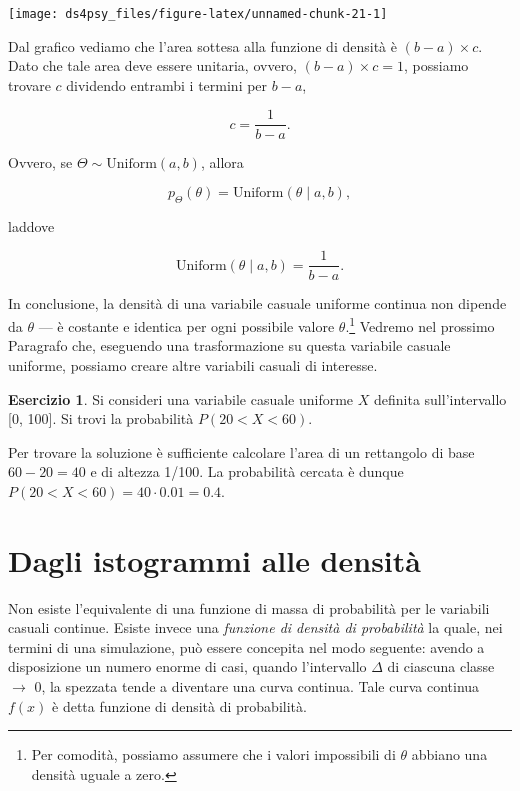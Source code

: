 \documentclass[
  11pt,
]{krantz}
\theoremstyle{definition}
\theoremstyle{definition}
\theoremstyle{definition}
\newtheorem{exercise}{Esercizio}[chapter]
\theoremstyle{definition}
\theoremstyle{remark}
\begin{document}
\begin{center}\texttt{[image: ds4psy\_files/figure-latex/unnamed-chunk-21-1]} \end{center}

\noindent Dal grafico vediamo che l'area sottesa alla funzione di densità è \((b - a)\times c\). Dato che tale area deve essere unitaria, ovvero, \((b - a) \times c = 1\), possiamo trovare \(c\) dividendo entrambi i termini per \(b - a\),

\[
c  = \frac{\displaystyle{1}}{\displaystyle b - a}.
\]

Ovvero, se \(\Theta \sim \mbox{Uniform}(a, b)\), allora

\[
p_{\Theta}(\theta) = \mbox{Uniform}(\theta \mid a, b),
\]

laddove

\[
\mbox{Uniform}(\theta \mid a, b) = \frac{1}{b - a}.
\]

In conclusione, la densità di una variabile casuale uniforme continua non dipende da \(\theta\) --- è costante e identica per ogni possibile valore \(\theta\).\footnote{Per comodità, possiamo assumere che i valori impossibili di \(\theta\) abbiano una densità uguale a zero.} Vedremo nel prossimo Paragrafo che, eseguendo una trasformazione su questa variabile casuale uniforme, possiamo creare altre variabili casuali di interesse.

\begin{exercise}
Si consideri una variabile casuale uniforme \(X\) definita sull'intervallo {[}0, 100{]}. Si trovi la probabilità \(P(20 < X < 60)\).

Per trovare la soluzione è sufficiente calcolare l'area di un rettangolo di base \(60 - 20 = 40\) e di altezza 1/100. La probabilità cercata è dunque \(P(20 < X < 60) = 40 \cdot 0.01 = 0.4\).
\end{exercise}

\hypertarget{dagli-istogrammi-alle-densituxe0}{%
\section{Dagli istogrammi alle densità}\label{dagli-istogrammi-alle-densituxe0}}

Non esiste l'equivalente di una funzione di massa di probabilità per le variabili casuali continue. Esiste invece una \emph{funzione di densità di probabilità} la quale, nei termini di una simulazione, può essere concepita nel modo seguente: avendo a disposizione un numero enorme di casi, quando l'intervallo \(\Delta\) di ciascuna classe \(\rightarrow\) 0, la spezzata tende a diventare una curva continua. Tale curva continua \(f(x)\) è detta funzione di densità di probabilità.
\end{document}
